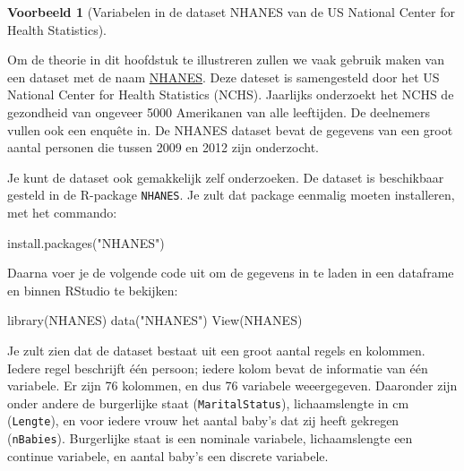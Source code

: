 \documentclass[
  a4paper,
]{scrbook}
\newenvironment{Shaded}{\begin{snugshade}}{\end{snugshade}}
\newcommand{\FunctionTok}[1]{\textcolor[rgb]{0.28,0.35,0.67}{#1}}
\newcommand{\NormalTok}[1]{\textcolor[rgb]{0.00,0.23,0.31}{#1}}
\newcommand{\StringTok}[1]{\textcolor[rgb]{0.13,0.47,0.30}{#1}}
\theoremstyle{definition}
\theoremstyle{definition}
\newtheorem{example}{Voorbeeld}[chapter]
\theoremstyle{remark}
\begin{document}
\begin{example}[Variabelen in de dataset NHANES van de US National
Center for Health
Statistics]\protect\hypertarget{exm-NHANES}{}\label{exm-NHANES}

Om de theorie in dit hoofdstuk te illustreren zullen we vaak gebruik
maken van een dataset met de naam
\href{https://cran.r-project.org/web/packages/NHANES/}{NHANES}. Deze
dateset is samengesteld door het US National Center for Health
Statistics (NCHS). Jaarlijks onderzoekt het NCHS de gezondheid van
ongeveer 5000 Amerikanen van alle leeftijden. De deelnemers vullen ook
een enquête in. De NHANES dataset bevat de gegevens van een groot aantal
personen die tussen 2009 en 2012 zijn onderzocht.

Je kunt de dataset ook gemakkelijk zelf onderzoeken. De dataset is
beschikbaar gesteld in de R-package \texttt{NHANES}. Je zult dat package
eenmalig moeten installeren, met het commando:

\begin{Shaded}
\begin{Highlighting}[]
\FunctionTok{install.packages}\NormalTok{(}\StringTok{"NHANES"}\NormalTok{)}
\end{Highlighting}
\end{Shaded}

Daarna voer je de volgende code uit om de gegevens in te laden in een
dataframe en binnen RStudio te bekijken:

\begin{Shaded}
\begin{Highlighting}[]
\FunctionTok{library}\NormalTok{(NHANES)}
\FunctionTok{data}\NormalTok{(}\StringTok{"NHANES"}\NormalTok{)}
\FunctionTok{View}\NormalTok{(NHANES)}
\end{Highlighting}
\end{Shaded}

Je zult zien dat de dataset bestaat uit een groot aantal regels en
kolommen. Iedere regel beschrijft één persoon; iedere kolom bevat de
informatie van één variabele. Er zijn 76 kolommen, en dus 76 variabele
weeergegeven. Daaronder zijn onder andere de burgerlijke staat
(\texttt{MaritalStatus}), lichaamslengte in cm (\texttt{Lengte}), en
voor iedere vrouw het aantal baby's dat zij heeft gekregen
(\texttt{nBabies}). Burgerlijke staat is een nominale variabele,
lichaamslengte een continue variabele, en aantal baby's een discrete
variabele.

\end{example}
\end{document}
